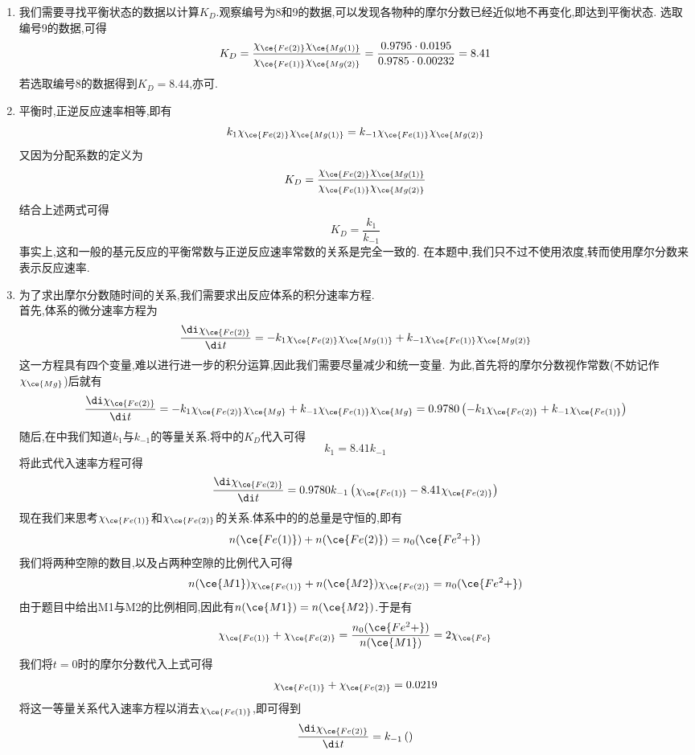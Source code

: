 \documentclass{ctexart}
\begin{document}
\begin{solution}
    \begin{enumerate}[label=\tbf{\arabic{Pcounter}-\arabic*},topsep=0pt,parsep=0pt,itemsep=0pt,partopsep=0pt]
        \item 我们需要寻找平衡状态的数据以计算$K_D$.观察编号为8和9的数据,可以发现各物种的摩尔分数已经近似地不再变化,即达到平衡状态.%
            选取编号$9$的数据,可得
            \[K_D=\dfrac{\chi_{\ce{Fe(2)}}\chi_{\ce{Mg(1)}}}{\chi_{\ce{Fe(1)}}\chi_{\ce{Mg(2)}}}
            =\dfrac{0.9795\cdot0.0195}{0.9785\cdot0.00232}=8.41\]
            若选取编号$8$的数据得到$K_D=8.44$,亦可.
        \item 平衡时,正逆反应速率相等,即有
            \[k_1\chi_{\ce{Fe(2)}}\chi_{\ce{Mg(1)}}=k_{-1}\chi_{\ce{Fe(1)}}\chi_{\ce{Mg(2)}}\]
            又因为分配系数的定义为
            \[K_D=\dfrac{\chi_{\ce{Fe(2)}}\chi_{\ce{Mg(1)}}}{\chi_{\ce{Fe(1)}}\chi_{\ce{Mg(2)}}}\]
            结合上述两式可得
            \[K_D=\dfrac{k_1}{k_{-1}}\]
            事实上,这和一般的基元反应的平衡常数与正逆反应速率常数的关系是完全一致的.%
            在本题中,我们只不过不使用浓度,转而使用摩尔分数来表示反应速率.
        \item 为了求出摩尔分数随时间的关系,我们需要求出反应体系的积分速率方程.\\
            首先,体系的微分速率方程为
            \[\dfrac{\di\chi_{\ce{Fe(2)}}}{\di t}=-k_1\chi_{\ce{Fe(2)}}\chi_{\ce{Mg(1)}}+k_{-1}\chi_{\ce{Fe(1)}}\chi_{\ce{Mg(2)}}\]
            这一方程具有四个变量,难以进行进一步的积分运算,因此我们需要尽量减少和统一变量.%
            为此,首先将的摩尔分数视作常数(不妨记作$\chi_{\ce{Mg}}$)后就有
            \[\dfrac{\di\chi_{\ce{Fe(2)}}}{\di t}=-k_1\chi_{\ce{Fe(2)}}\chi_{\ce{Mg}}+k_{-1}\chi_{\ce{Fe(1)}}\chi_{\ce{Mg}}
            =0.9780\left(-k_1\chi_{\ce{Fe(2)}}+k_{-1}\chi_{\ce{Fe(1)}}\right)\]
            随后,在中我们知道$k_1$与$k_{-1}$的等量关系.将中的$K_D$代入可得
            \[k_1=8.41 k_{-1}\]
            将此式代入速率方程可得
            \[\dfrac{\di\chi_{\ce{Fe(2)}}}{\di t}=0.9780k_{-1}\left(\chi_{\ce{Fe(1)}}-8.41\chi_{\ce{Fe(2)}}\right)\]
            现在我们来思考$\chi_{\ce{Fe(1)}}$和$\chi_{\ce{Fe(2)}}$的关系.体系中的的总量是守恒的,即有
            \[n(\ce{Fe(1)})+n(\ce{Fe(2)})=n_0(\ce{Fe^2+})\]
            我们将两种空隙的数目,以及占两种空隙的比例代入可得
            \[n(\ce{{M1}})\chi_{\ce{Fe(1)}}+n(\ce{{M2}})\chi_{\ce{Fe(2)}}=n_0(\ce{Fe^2+})\]
            由于题目中给出M1与M2的比例相同,因此有$n(\ce{{M1}})=n(\ce{{M2}})$.于是有
            \[\chi_{\ce{Fe(1)}}+\chi_{\ce{Fe(2)}}=\dfrac{n_0(\ce{Fe^2+})}{n(\ce{{M1}})}=2\chi_{\ce{Fe}}\]
            我们将$t=0$时的摩尔分数代入上式可得
            \[\chi_{\ce{Fe(1)}}+\chi_{\ce{Fe(2)}}=0.0219\]
            将这一等量关系代入速率方程以消去$\chi_{\ce{Fe(1)}}$,即可得到
            \[\dfrac{\di\chi_{\ce{Fe(2)}}}{\di t}=k_{-1}\left(\right)\]
    \end{enumerate}
\end{solution}
\end{document}
